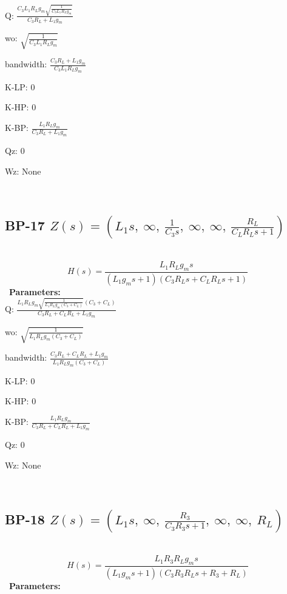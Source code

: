 \documentclass{article}
\begin{document}
Q: $\frac{C_{3} L_{1} R_{L} g_{m} \sqrt{\frac{1}{C_{3} L_{1} R_{L} g_{m}}}}{C_{3} R_{L} + L_{1} g_{m}}$\ 

wo: $\sqrt{\frac{1}{C_{3} L_{1} R_{L} g_{m}}}$\ 

bandwidth: $\frac{C_{3} R_{L} + L_{1} g_{m}}{C_{3} L_{1} R_{L} g_{m}}$\ 

K-LP: $0$\ 

K-HP: $0$\ 

K-BP: $\frac{L_{1} R_{L} g_{m}}{C_{3} R_{L} + L_{1} g_{m}}$\ 

Qz: $0$\ 

Wz: $\text{None}$\ 

\ 

\subsection{BP-17 $Z(s) = \left( L_{1} s, \  \infty, \  \frac{1}{C_{3} s}, \  \infty, \  \infty, \  \frac{R_{L}}{C_{L} R_{L} s + 1}\right)$ } \ 
\textbf{\[H(s) = \frac{L_{1} R_{L} g_{m} s}{\left(L_{1} g_{m} s + 1\right) \left(C_{3} R_{L} s + C_{L} R_{L} s + 1\right)}\] } \ 
\textbf{Parameters:}\\ 

Q: $\frac{L_{1} R_{L} g_{m} \sqrt{\frac{1}{L_{1} R_{L} g_{m} \left(C_{3} + C_{L}\right)}} \left(C_{3} + C_{L}\right)}{C_{3} R_{L} + C_{L} R_{L} + L_{1} g_{m}}$\ 

wo: $\sqrt{\frac{1}{L_{1} R_{L} g_{m} \left(C_{3} + C_{L}\right)}}$\ 

bandwidth: $\frac{C_{3} R_{L} + C_{L} R_{L} + L_{1} g_{m}}{L_{1} R_{L} g_{m} \left(C_{3} + C_{L}\right)}$\ 

K-LP: $0$\ 

K-HP: $0$\ 

K-BP: $\frac{L_{1} R_{L} g_{m}}{C_{3} R_{L} + C_{L} R_{L} + L_{1} g_{m}}$\ 

Qz: $0$\ 

Wz: $\text{None}$\ 

\ 

\subsection{BP-18 $Z(s) = \left( L_{1} s, \  \infty, \  \frac{R_{3}}{C_{3} R_{3} s + 1}, \  \infty, \  \infty, \  R_{L}\right)$ } \ 
\textbf{\[H(s) = \frac{L_{1} R_{3} R_{L} g_{m} s}{\left(L_{1} g_{m} s + 1\right) \left(C_{3} R_{3} R_{L} s + R_{3} + R_{L}\right)}\] } \ 
\textbf{Parameters:}\\ 
\end{document}
